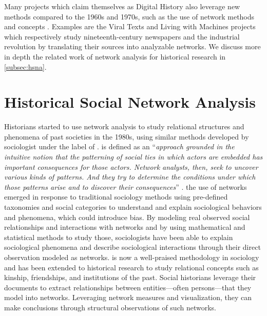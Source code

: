 Many projects which claim themselves as Digital History also leverage new methods compared to the 1960s and 1970s, such as the use of network methods and concepts \cite{ahnertNetworkTurnChanging2020}.
Examples are the Viral Texts \cite{cordell2017viral} and Living with Machines \cite{ardanuyLivingMachinesStudy2020} projects which respectively study nineteenth-century newspapers and the industrial revolution by translating their sources into analyzable networks.
We discuss more in depth the related work of network analysis for historical research in \autoref{subsec:hsna}.


\section{Historical Social Network Analysis}\label{sec:hsna}

Historians started to use network analysis to study relational structures and phenomena of past societies in the 1980s, using similar methods developed by sociologist under the label of \sna.
\sna is defined as an ``\textit{approach grounded in the intuitive notion that the patterning of social ties in which actors are embedded has important consequences for those actors. Network analysts, then, seek to uncover various kinds of patterns. And they try to determine the conditions under which those patterns arise and to discover their consequences}'' \cite{freeman_development_2004}.
the use of networks emerged in response to traditional sociology methods using pre-defined taxonomies and social categories to understand and explain sociological behaviors and phenomena, which could introduce bias.
By modeling real observed social relationships and interactions with networks and by using mathematical and statistical methods to study those, sociologists have been able to explain sociological phenomena and describe sociological interactions through their direct observation modeled as networks.
\sna is now a well-praised methodology in sociology and has been extended to historical research to study relational concepts such as kinship, friendships, and institutions of the past.
Social historians leverage their documents to extract relationships between entities---often persons---that they model into networks.
Leveraging network measures and visualization, they can make conclusions through structural observations of such networks.


